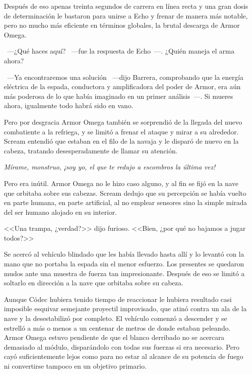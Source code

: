 Después de eso apenas treinta segundos de carrera en línea recta y una gran dosis de determinación le bastaron para unirse a Echo y frenar de manera más notable, pero no mucho más eficiente en términos globales, la brutal descarga de Armor Omega.

~---¿Qué haces aquí? ~---fue la respuesta de Echo~---. ¿Quién maneja el arma ahora?

~---Ya encontraremos una solución ~---dijo Barrera, comprobando que la energía eléctrica de la espada, conductora y amplificadora del poder de Armor, era aún más poderosa de lo que había imaginado en un primer análisis~---. Si mueres ahora, igualmente todo habrá sido en vano.

Pero por desgracia Armor Omega también se sorprendió de la llegada del nuevo combatiente a la refriega, y se limitó a frenar el ataque y mirar a su alrededor. Scream entendió que estaban en el filo de la navaja y le disparó de nuevo en la cabeza, tratando desesperadamente de llamar su atención.

\emph{Mírame, monstruo, ¡soy yo, el que te redujo a escombros la última vez!}

Pero era inútil. Armor Omega no le hizo caso alguno, y al fin se fijó en la nave que orbitaba sobre sus cabezas. Scream dedujo que su percepción se había vuelto en parte humana, en parte artificial, al no emplear sensores sino la simple mirada del ser humano alojado en su interior.

<<Una trampa, ¿verdad?>> dijo furioso. <<Bien, ¿por qué no bajamos a jugar todos?>>

Se acercó al vehículo blindado que les había llevado hasta allí y lo levantó con la mano que no portaba la espada sin el menor esfuerzo. Los presentes se quedaron mudos ante una muestra de fuerza tan impresionante. Después de eso se limitó a soltarlo en dirección a la nave que orbitaba sobre su cabeza.

Aunque Códec hubiera tenido tiempo de reaccionar le hubiera resultado casi imposible esquivar semejante proyectil improvisado, que atinó contra un ala de la nave y la desestabilizó por completo. El vehículo comenzó a descender y se estrelló a más o menos a un centenar de metros de donde estaban peleando. Armor Omega estuvo pendiente de que el blanco derribado no se acercara demasiado al módulo, disparándolo con todas sus fuerzas si era necesario. Pero cayó suficientemente lejos como para no estar al alcance de su potencia de fuego ni convertirse tampoco en un objetivo primario.

